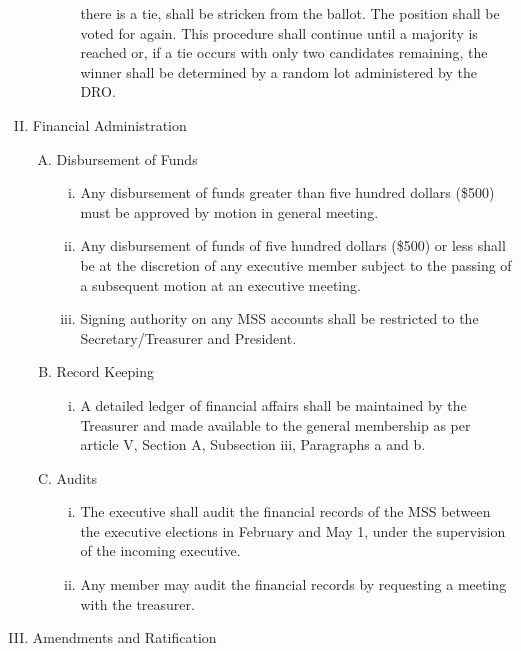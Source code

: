 \documentclass[11pt]{article}
\begin{document}
\begin{enumerate}[I.]
\begin{enumerate}[A)]
\begin{enumerate}[i)]
            there is a tie, shall be stricken from the ballot. The position
            shall be voted for again. This procedure shall continue until a
            majority is reached or, if a tie occurs with only two candidates
            remaining, the winner shall be determined by a random lot
            administered by the DRO. 
        \end{enumerate}
    \end{enumerate}
  \item Financial Administration
    \begin{enumerate}[A)]
      \item Disbursement of Funds
        \begin{enumerate}[i)]
          \item Any disbursement of funds greater than five hundred dollars
            (\$500) must be approved by motion in general meeting.
          \item  Any disbursement of funds of five hundred dollars (\$500) or
            less shall be at the discretion of any executive member subject to
            the passing of a subsequent motion at an executive meeting. 
          \item Signing authority on any MSS accounts shall be restricted to
            the Secretary/Treasurer and President. 
        \end{enumerate}
      \item Record Keeping
        \begin{enumerate}[i)]
          \item A detailed ledger of financial affairs shall be maintained by
            the Treasurer and made available to the general membership as per
            article V, Section A, Subsection iii, Paragraphs a and b. 
        \end{enumerate}
      \item Audits
        \begin{enumerate}[i)]
          \item The executive shall audit the financial records of the MSS
            between the executive elections in February and May 1, under the
            supervision of the incoming executive.
          \item Any member may audit the financial records by requesting a
            meeting with the treasurer. 
        \end{enumerate}
    \end{enumerate}
  \item Amendments and Ratification
  

\end{enumerate}
\end{document}
